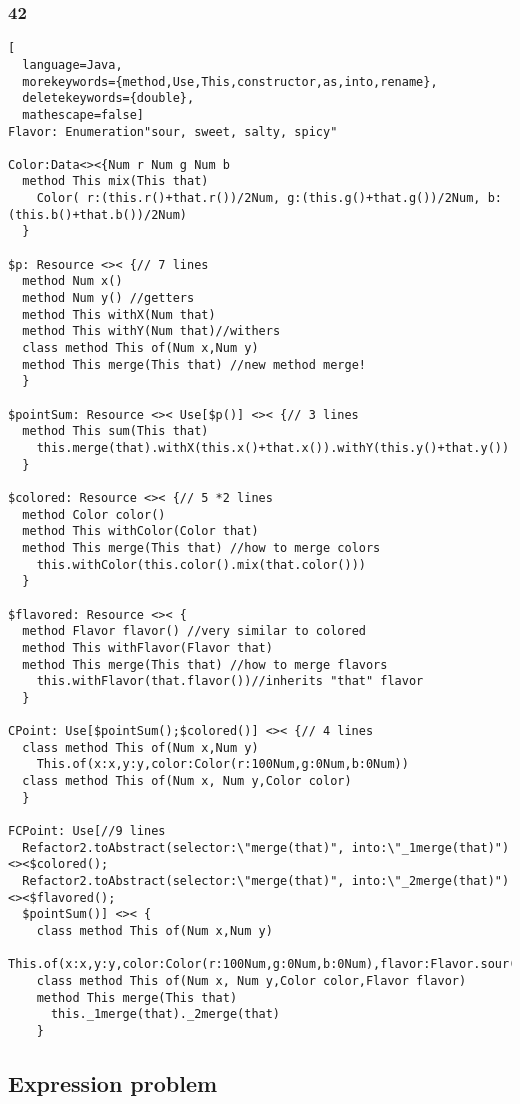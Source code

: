 \subsubsection{42}
\begin{lstlisting}[
  language=Java,
  morekeywords={method,Use,This,constructor,as,into,rename},
  deletekeywords={double},
  mathescape=false]
Flavor: Enumeration"sour, sweet, salty, spicy"

Color:Data<><{Num r Num g Num b
  method This mix(This that)
    Color( r:(this.r()+that.r())/2Num, g:(this.g()+that.g())/2Num, b:(this.b()+that.b())/2Num)
  }

$p: Resource <>< {// 7 lines
  method Num x()
  method Num y() //getters
  method This withX(Num that)
  method This withY(Num that)//withers
  class method This of(Num x,Num y)
  method This merge(This that) //new method merge!
  }

$pointSum: Resource <>< Use[$p()] <>< {// 3 lines
  method This sum(This that)
    this.merge(that).withX(this.x()+that.x()).withY(this.y()+that.y())
  }

$colored: Resource <>< {// 5 *2 lines
  method Color color()
  method This withColor(Color that)
  method This merge(This that) //how to merge colors
    this.withColor(this.color().mix(that.color()))
  }

$flavored: Resource <>< {
  method Flavor flavor() //very similar to colored
  method This withFlavor(Flavor that)
  method This merge(This that) //how to merge flavors 
    this.withFlavor(that.flavor())//inherits "that" flavor
  }

CPoint: Use[$pointSum();$colored()] <>< {// 4 lines
  class method This of(Num x,Num y)
    This.of(x:x,y:y,color:Color(r:100Num,g:0Num,b:0Num))
  class method This of(Num x, Num y,Color color)
  }

FCPoint: Use[//9 lines
  Refactor2.toAbstract(selector:\"merge(that)", into:\"_1merge(that)")<><$colored();
  Refactor2.toAbstract(selector:\"merge(that)", into:\"_2merge(that)")<><$flavored();
  $pointSum()] <>< {
    class method This of(Num x,Num y)
      This.of(x:x,y:y,color:Color(r:100Num,g:0Num,b:0Num),flavor:Flavor.sour())
    class method This of(Num x, Num y,Color color,Flavor flavor)
    method This merge(This that)
      this._1merge(that)._2merge(that)
    }
\end{lstlisting}

\subsection{Expression problem}
